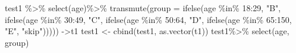\documentclass[
]{article}
\newenvironment{Shaded}{\begin{snugshade}}{\end{snugshade}}
\newcommand{\AttributeTok}[1]{\textcolor[rgb]{0.77,0.63,0.00}{#1}}
\newcommand{\DecValTok}[1]{\textcolor[rgb]{0.00,0.00,0.81}{#1}}
\newcommand{\FunctionTok}[1]{\textcolor[rgb]{0.00,0.00,0.00}{#1}}
\newcommand{\NormalTok}[1]{#1}
\newcommand{\OtherTok}[1]{\textcolor[rgb]{0.56,0.35,0.01}{#1}}
\newcommand{\SpecialCharTok}[1]{\textcolor[rgb]{0.00,0.00,0.00}{#1}}
\newcommand{\StringTok}[1]{\textcolor[rgb]{0.31,0.60,0.02}{#1}}
\begin{document}
\begin{Shaded}
\begin{Highlighting}[]
\NormalTok{test1 }\SpecialCharTok{\%\textgreater{}\%}
  \FunctionTok{select}\NormalTok{(age)}\SpecialCharTok{\%\textgreater{}\%}
  \FunctionTok{transmute}\NormalTok{(}\AttributeTok{group =} \FunctionTok{ifelse}\NormalTok{(age }\SpecialCharTok{\%in\%} \DecValTok{18}\SpecialCharTok{:}\DecValTok{29}\NormalTok{, }\StringTok{"B"}\NormalTok{,}
         \FunctionTok{ifelse}\NormalTok{(age }\SpecialCharTok{\%in\%} \DecValTok{30}\SpecialCharTok{:}\DecValTok{49}\NormalTok{, }\StringTok{"C"}\NormalTok{, }\FunctionTok{ifelse}\NormalTok{(age }\SpecialCharTok{\%in\%} \DecValTok{50}\SpecialCharTok{:}\DecValTok{64}\NormalTok{, }\StringTok{"D"}\NormalTok{, }\FunctionTok{ifelse}\NormalTok{(age }\SpecialCharTok{\%in\%} \DecValTok{65}\SpecialCharTok{:}\DecValTok{150}\NormalTok{, }\StringTok{"E"}\NormalTok{, }\StringTok{"skip"}\NormalTok{))))) }\OtherTok{{-}\textgreater{}}\NormalTok{t1}
\NormalTok{test1 }\OtherTok{\textless{}{-}} \FunctionTok{cbind}\NormalTok{(test1, }\FunctionTok{as.vector}\NormalTok{(t1))}
\NormalTok{test1}\SpecialCharTok{\%\textgreater{}\%}
  \FunctionTok{select}\NormalTok{(age, group)}
\end{Highlighting}
\end{Shaded}
\end{document}
